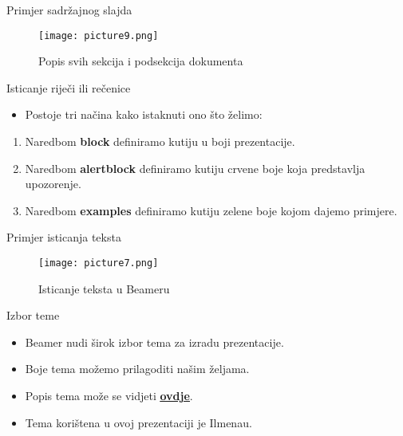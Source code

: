 \documentclass{beamer}
\begin{document}
\begin{frame}{Primjer sadržajnog slajda}
	\begin{figure}
		\texttt{[image: picture9.png]} 
		\caption{Popis svih sekcija i podsekcija dokumenta}
	\end{figure}
\end{frame}

\begin{frame}{Isticanje riječi ili rečenice}
	\begin{itemize}
		\item Postoje tri načina kako istaknuti ono što želimo:
	\end{itemize}
	\begin{enumerate}
		\item Naredbom \textbf{block} definiramo kutiju u boji prezentacije.
		\item Naredbom \textbf{alertblock} definiramo kutiju crvene boje koja predstavlja upozorenje.
		\item Naredbom \textbf{examples} definiramo kutiju zelene boje kojom dajemo primjere.
	\end{enumerate}
\end{frame}

\begin{frame}{Primjer isticanja teksta}
	 	\begin{figure}
		\texttt{[image: picture7.png]} 
		\caption{Isticanje teksta u Beameru}
	\end{figure}
\end{frame}

\begin{frame}{Izbor teme}
	\begin{itemize}
		\item Beamer nudi širok izbor tema za izradu prezentacije.
		\item Boje tema možemo prilagoditi našim željama.
		\item Popis tema može se vidjeti \hyperlink{http://deic.uab.es/~iblanes/beamer_gallery/index_by_theme.html}{\underline{\textbf{ovdje}}}.
		\item Tema korištena u ovoj prezentaciji je Ilmenau.
	\end{itemize}
\end{frame}
\end{document}
